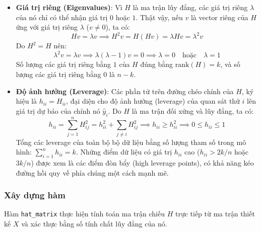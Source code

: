 \begin{itemize}
    \item \textbf{Giá trị riêng (Eigenvalues)}: Vì $H$ là ma trận lũy đẳng, các giá trị riêng $\lambda$ của nó chỉ có thể nhận giá trị $0$ hoặc $1$. 
    Thật vậy, nếu $v$ là vector riêng của $H$ ứng với giá trị riêng $\lambda$ ($v \neq 0$), ta có:
    \begin{equation}
        H v = \lambda v \implies H^2 v = H(Hv) = \lambda H v = \lambda^2 v
    \end{equation}
    Do $H^2 = H$ nên:
    \begin{equation}
        \lambda^2 v = \lambda v \implies \lambda(\lambda - 1)v = 0 \implies \lambda = 0 \quad \text{hoặc} \quad \lambda = 1
    \end{equation}
    Số lượng các giá trị riêng bằng $1$ của $H$ đúng bằng $\text{rank}(H) = k$, và số lượng các giá trị riêng bằng $0$ là $n - k$.
    
    \item \textbf{Độ ảnh hưởng (Leverage)}: Các phần tử trên đường chéo chính của $H$, ký hiệu là $h_{ii} = H_{ii}$, đại diện cho độ ảnh hưởng (leverage) của quan sát thứ $i$ lên giá trị dự báo của chính nó $\hat{y}_i$.
    Do $H$ là ma trận đối xứng và lũy đẳng, ta có:
    \begin{equation}
        h_{ii} = \sum_{j=1}^n H_{ij}^2 = h_{ii}^2 + \sum_{j \neq i} H_{ij}^2 \implies h_{ii} \geq h_{ii}^2 \implies 0 \leq h_{ii} \leq 1
    \end{equation}
    Tổng các leverage của toàn bộ bộ dữ liệu bằng số lượng tham số trong mô hình: $\sum_{i=1}^n h_{ii} = k$. Những điểm dữ liệu có giá trị $h_{ii}$ cao ($h_{ii} > 2k/n$ hoặc $3k/n$) được xem là các điểm đòn bẩy (high leverage points), có khả năng kéo đường hồi quy về phía chúng một cách mạnh mẽ.
\end{itemize}

\subsubsection{Xây dựng hàm}
Hàm \texttt{hat\_matrix} thực hiện tính toán ma trận chiếu $H$ trực tiếp từ ma trận thiết kế $X$ và xác thực bằng số tính chất lũy đẳng của nó.

